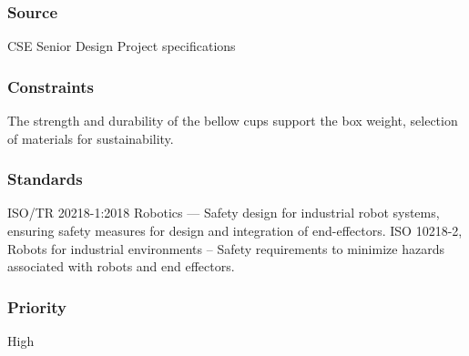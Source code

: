 \subsubsection{Source}
CSE Senior Design Project specifications
\subsubsection{Constraints}
The strength and durability of the bellow cups support the box weight, selection of materials for sustainability.
\subsubsection{Standards}
ISO/TR 20218-1:2018 Robotics — Safety design for industrial robot systems, ensuring safety measures for design and integration of end-effectors.
ISO 10218-2, Robots for industrial environments – Safety requirements to minimize hazards associated with robots and end effectors.
\subsubsection{Priority}
High